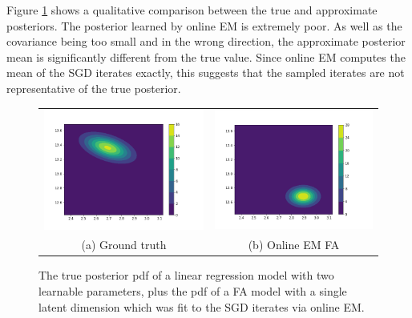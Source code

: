 \documentclass[msc,deptreport.inf]{infthesis} %
\begin{document}
Figure \ref{fig:true_posterior_vs_online_em} shows a qualitative comparison between the true and approximate posteriors. The posterior learned by online EM is extremely poor. As well as the covariance being too small and in the wrong direction, the approximate posterior mean is significantly different from the true value. Since online EM computes the mean of the SGD iterates exactly, this suggests that the sampled iterates are not representative of the true posterior. 
\begin{figure}[!htbp] 
	\begin{tabular}{cc}
		 \includegraphics[width=70mm]{plots/linear_model_poor_estimation_true_posterior__alpha=0.01__beta=0.1.png}
		 & \includegraphics[width=70mm]{plots/linear_model_poor_estimation_online_em__alpha=0.01__beta=0.1__latent_dim=1.png} \\
		 (a) Ground truth
		 & (b) Online EM FA \\[6pt]
	\end{tabular}
	\caption{The true posterior pdf of a linear regression model with two learnable parameters, plus the pdf of a FA model with a single latent dimension which was fit to the SGD iterates via online EM.}
	\label{fig:true_posterior_vs_online_em}
\end{figure}
\end{document}
